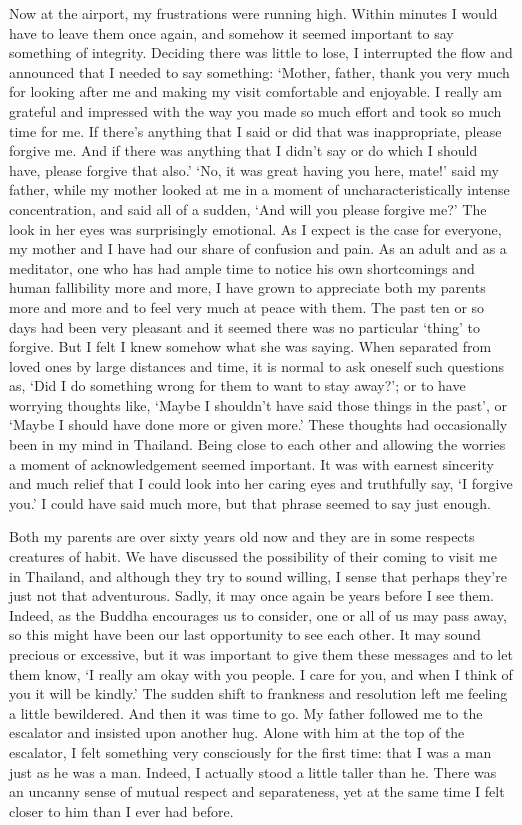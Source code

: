 Now at the airport, my frustrations were running high. Within minutes I
would have to leave them once again, and somehow it seemed important to
say something of integrity. Deciding there was little to lose, I
interrupted the flow and announced that I needed to say something: 
`Mother, father, thank you very much for looking after me and making my
visit comfortable and enjoyable. I really am grateful and impressed with
the way you made so much effort and took so much time for me. If there's
anything that I said or did that was inappropriate, please forgive me. 
And if there was anything that I didn't say or do which I should have, 
please forgive that also.' `No, it was great having you here, mate!'
said my father, while my mother looked at me in a moment of
uncharacteristically intense concentration, and said all of a sudden, 
`And will you please forgive me?' The look in her eyes was surprisingly
emotional. As I expect is the case for everyone, my mother and I have
had our share of confusion and pain. As an adult and as a meditator, one
who has had ample time to notice his own shortcomings and human
fallibility more and more, I have grown to appreciate both my parents
more and more and to feel very much at peace with them. The past ten or
so days had been very pleasant and it seemed there was no particular
`thing' to forgive. But I felt I knew somehow what she was saying. When
separated from loved ones by large distances and time, it is normal to
ask oneself such questions as, `Did I do something wrong for them to
want to stay away?'; or to have worrying thoughts like, `Maybe I
shouldn't have said those things in the past', or `Maybe I should have
done more or given more.' These thoughts had occasionally been in my
mind in Thailand. Being close to each other and allowing the worries a
moment of acknowledgement seemed important. It was with earnest
sincerity and much relief that I could look into her caring eyes and
truthfully say, `I forgive you.' I could have said much more, but that
phrase seemed to say just enough. 

Both my parents are over sixty years old now and they are in some
respects creatures of habit. We have discussed the possibility of their
coming to visit me in Thailand, and although they try to sound willing, 
I sense that perhaps they're just not that adventurous. Sadly, it may
once again be years before I see them. Indeed, as the Buddha encourages
us to consider, one or all of us may pass away, so this might have been
our last opportunity to see each other. It may sound precious or
excessive, but it was important to give them these messages and to let
them know, `I really am okay with you people. I care for you, and when I
think of you it will be kindly.' The sudden shift to frankness and
resolution left me feeling a little bewildered. And then it was time to
go. My father followed me to the escalator and insisted upon another
hug. Alone with him at the top of the escalator, I felt something very
consciously for the first time: that I was a man just as he was a man. 
Indeed, I actually stood a little taller than he. There was an uncanny
sense of mutual respect and separateness, yet at the same time I felt
closer to him than I ever had before. 

